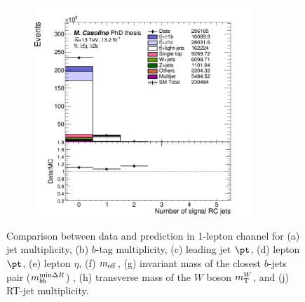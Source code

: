 \begin{figure}[p]
\begin{subfigure}{0.33\textwidth}
  \caption{}
  \label{}
\end{subfigure}
\begin{subfigure}{0.33\textwidth}
  \centering
  \includegraphics[width=0.9\textwidth]{figures/VLQ/presel/1lep/canv_c1l2b_RCjets_n.png}
  \caption{}
  \label{}
\end{subfigure}
\captionsetup{width=0.85\textwidth} \caption{\small Comparison between data and prediction in 1-lepton channel for (a) jet multiplicity, (b) $b$-tag multiplicity, (c) leading jet $\pt$, (d) lepton $\pt$, (e) lepton $\eta$, (f) $m_{\rm eff}$, (g) invariant mass of the closest $b$-jets pair ($m_{bb}^{{\rm min}\Delta R}$) , (h) transverse mass of the $W$ boson $m_{\rm T}^{W}$, and (j) RT-jet multiplicity.}
\label{sec:vlq:fig:1ldatamc}
\end{figure}



